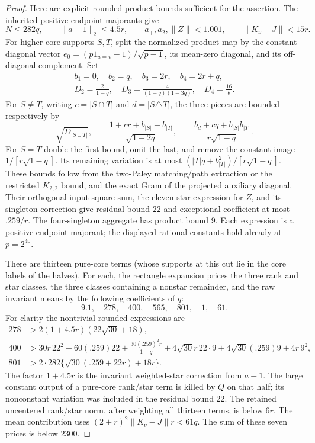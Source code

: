 \begin{proof}
Here are explicit rounded product bounds sufficient for the assertion.
The inherited positive endpoint majorants give
\[
 N\le282q,\qquad \|a-1\|_2\le4.5r,
 \qquad a_+,a_2,\|Z\|<1.001,
 \qquad \|K_\nu-J\|<15r.
\]
For higher core supports $S,T$, split the normalized product map by
the constant diagonal vector
$e_0=(p1_{u=v}-1)/\sqrt{p-1}$, its mean-zero diagonal, and its
off-diagonal complement.  Set
\begin{gather*}
 b_1=0,\quad b_2=q,\quad b_3=2r,\quad b_4=2r+q,\\
 D_2=\frac2{1-q},\quad
 D_3=\frac4{(1-q)(1-3q)},\quad D_4=\frac{16}{\theta}.
\end{gather*}
For $S\ne T$, writing $c=|S\cap T|$ and $d=|S\triangle T|$,
the three pieces are bounded respectively by
\[
 \sqrt{D_{|S\cup T|}},\qquad
 \frac{1+cr+b_{|S|}+b_{|T|}}{\sqrt{1-2q}},\qquad
 \frac{b_d+cq+b_{|S|}b_{|T|}}{r\sqrt{1-q}}.
\]
For $S=T$ double the first bound, omit the last, and remove the
constant image $1/[r\sqrt{1-q}]$.  Its remaining variation is at
most $(|T|q+b_{|T|}^2)/[r\sqrt{1-q}]$.  These bounds follow from
the two-Paley matching/path extraction or the restricted $K_{2,2}$
bound, and the exact Gram of the projected auxiliary diagonal.
Their orthogonal-input square sum, the eleven-star expression for
$Z$, and its singleton correction give residual bound 22 and
exceptional coefficient at most $.259/r$.  The four-singleton aggregate
has product bound 9.  Each expression is a positive endpoint majorant;
the displayed rational constants hold already at $p=2^{40}$.

There are thirteen pure-core terms (whose supports at this cut lie in the core labels of the halves).  For each, the rectangle expansion
prices the three rank and star classes, the three classes containing
a nonstar remainder, and the raw invariant means by the following
coefficients of $q$:
\[
 9.1,\quad278,\quad400,\quad565,\quad801,\quad1,\quad61.
\]
For clarity the nontrivial rounded expressions are
\begin{align*}
 278&>2(1+4.5r)(22\sqrt{30}+18),\\
 400&>30r\,22^2+60(.259)22
       +\frac{30(.259)^2r}{1-q}
       +4\sqrt{30}r\,22\cdot9
       +4\sqrt{30}(.259)9+4r\,9^2,\\
 801&>2\cdot282\{\sqrt{30}(.259+22r)+18r\}.
\end{align*}
The factor $1+4.5r$ is the invariant weighted-star correction from
$a-1$.  The large constant output of a pure-core rank/star term is
killed by $Q$ on that half; its nonconstant variation was included
in the residual bound 22.  The retained uncentered rank/star norm, after
weighting all thirteen terms, is below $6r$.  The mean contribution
uses $(2+r)^2\|K_\nu-J\|r<61q$.  The sum of these seven prices is
below 2300.


\end{proof}
